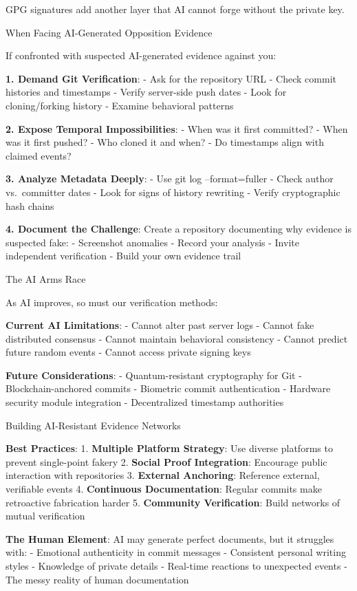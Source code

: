 GPG signatures add another layer that AI cannot forge without the
private key.

When Facing AI-Generated Opposition Evidence

If confronted with suspected AI-generated evidence against you:

\textbf{1. Demand Git Verification}: - Ask for the repository URL -
Check commit histories and timestamps - Verify server-side push dates -
Look for cloning/forking history - Examine behavioral patterns

\textbf{2. Expose Temporal Impossibilities}: - When was it first
committed? - When was it first pushed? - Who cloned it and when? - Do
timestamps align with claimed events?

\textbf{3. Analyze Metadata Deeply}: - Use git log --format=fuller -
Check author vs.~committer dates - Look for signs of history rewriting -
Verify cryptographic hash chains

\textbf{4. Document the Challenge}: Create a repository documenting why
evidence is suspected fake: - Screenshot anomalies - Record your
analysis - Invite independent verification - Build your own evidence
trail

The AI Arms Race

As AI improves, so must our verification methods:

\textbf{Current AI Limitations}: - Cannot alter past server logs -
Cannot fake distributed consensus - Cannot maintain behavioral
consistency - Cannot predict future random events - Cannot access
private signing keys

\textbf{Future Considerations}: - Quantum-resistant cryptography for Git
- Blockchain-anchored commits - Biometric commit authentication -
Hardware security module integration - Decentralized timestamp
authorities

Building AI-Resistant Evidence Networks

\textbf{Best Practices}: 1. \textbf{Multiple Platform Strategy}: Use
diverse platforms to prevent single-point fakery 2. \textbf{Social Proof
Integration}: Encourage public interaction with repositories 3.
\textbf{External Anchoring}: Reference external, verifiable events 4.
\textbf{Continuous Documentation}: Regular commits make retroactive
fabrication harder 5. \textbf{Community Verification}: Build networks of
mutual verification

\textbf{The Human Element}: AI may generate perfect documents, but it
struggles with: - Emotional authenticity in commit messages - Consistent
personal writing styles - Knowledge of private details - Real-time
reactions to unexpected events - The messy reality of human
documentation

